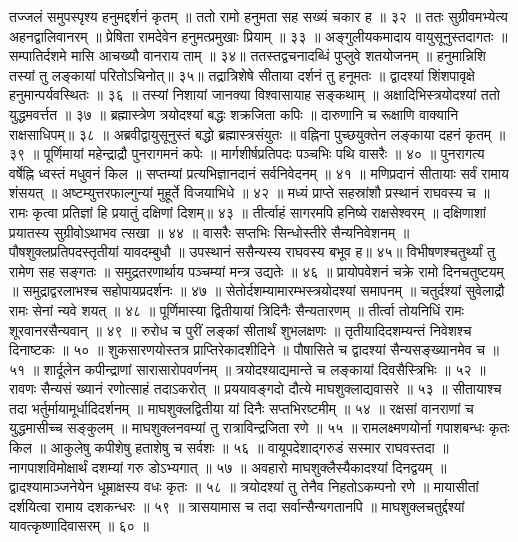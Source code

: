 तज्जलं समुपस्पृश्य हनुमद्दर्शनं कृतम् ॥
ततो रामो हनुमता सह सख्यं चकार ह ॥ ३२ ॥
ततः सुग्रीवमभ्येत्य अहनद्वालिवानरम् ॥
प्रेषिता रामदेवेन हनुमत्प्रमुखाः प्रियाम् ॥ ३३ ॥
अङ्गुलीयकमादाय वायुसूनुस्तदागतः ॥
सम्पातिर्दशमे मासि आचख्यौ वानराय ताम् ॥ ३४॥
ततस्तद्वचनादब्धिं पुप्लुवे शतयोजनम् ॥
हनुमान्निशि तस्यां तु लङ्कायां परितोऽचिनोत्॥ ३५॥
तद्रात्रिशेषे सीताया दर्शनं तु हनूमतः ॥
द्वादश्यां शिंशपावृक्षे हनुमान्पर्यवस्थितः ॥ ३६ ॥
तस्यां निशायां जानक्या विश्वासायाह सङ्कथाम् ॥
अक्षादिभिस्त्रयोदश्यां ततो युद्धमवर्त्तत ॥ ३७ ॥
ब्रह्मास्त्रेण त्रयोदश्यां बद्धः शक्रजिता कपिः ॥
दारुणानि च रूक्षाणि वाक्यानि राक्षसाधिपम्॥ ३८ ॥
अब्रवीद्वायुसूनुस्तं बद्धो ब्रह्मास्त्रसंयुतः ॥
वह्निना पुच्छयुक्तेन लङ्काया दहनं कृतम् ॥ ३९ ॥
पूर्णिमायां महेन्द्राद्रौ पुनरागमनं कपेः ॥
मार्गशीर्षप्रतिपदः पञ्चभिः पथि वासरैः ॥ ४० ॥
पुनरागत्य वर्षेह्नि ध्वस्तं मधुवनं किल ॥
सप्तम्यां प्रत्यभिज्ञानदानं सर्वनिवेदनम् ॥ ४१ ॥
मणिप्रदानं सीतायाः सर्वं रामाय शंसयत् ॥
अष्टम्युत्तरफाल्गुन्यां मुहूर्ते विजयाभिधे ॥ ४२ ॥
मध्यं प्राप्ते सहस्रांशौ प्रस्थानं राघवस्य च ॥
रामः कृत्वा प्रतिज्ञां हि प्रयातुं दक्षिणां दिशम्॥ ४३ ॥
तीर्त्वाहं सागरमपि हनिष्ये राक्षसेश्वरम् ॥
दक्षिणाशां प्रयातस्य सुग्रीवोऽथाभव त्सखा ॥ ४४ ॥
वासरैः सप्तभिः सिन्धोस्तीरे सैन्यनिवेशनम् ॥
पौषशुक्लप्रतिपदस्तृतीयां यावदम्बुधौ ॥
उपस्थानं ससैन्यस्य राघवस्य बभूव ह॥ ४५॥
विभीषणश्चतुर्थ्यां तु रामेण सह सङ्गतः ॥
समुद्रतरणार्थाय पञ्चम्यां मन्त्र उद्यतेः ॥ ४६ ॥
प्रायोपवेशनं चक्रे रामो दिनचतुष्टयम् ॥
समुद्राद्वरलाभश्च सहोपायप्रदर्शनः ॥ ४७ ॥
सेतोर्दशम्यामारम्भस्त्रयोदश्यां समापनम् ॥
चतुर्दश्यां सुवेलाद्रौ रामः सेनां न्यवे शयत् ॥ ४८ ॥
पूर्णिमास्या द्वितीयायां त्रिदिनैः सैन्यतारणम् ॥
तीर्त्वा तोयनिधिं रामः शूरवानरसैन्यवान् ॥ ४९ ॥
रुरोध च पुरीं लङ्कां सीतार्थं शुभलक्षणः ॥
तृतीयादिदशम्यन्तं निवेशश्च दिनाष्टकः ॥ ५० ॥
शुकसारणयोस्तत्र प्राप्तिरेकादशीदिने ॥
पौषासिते च द्वादश्यां सैन्यसङ्ख्यानमेव च ॥ ५१ ॥
शार्दूलेन कपीन्द्राणां सारासारोपवर्णनम् ॥
त्रयोदश्याद्यमान्ते च लङ्कायां दिवसैस्त्रिभिः ॥ ५२ ॥
रावणः सैन्यसं ख्यानं रणोत्साहं तदाऽकरोत् ॥
प्रययावङ्गदो दौत्ये माघशुक्लाद्यवासरे ॥ ५३ ॥
सीतायाश्च तदा भर्तुर्मायामूर्धादिदर्शनम् ॥
माघशुक्लद्वितीया यां दिनैः सप्तभिरष्टमीम् ॥ ५४ ॥
रक्षसां वानराणां च युद्धमासीच्च सङ्कुलम् ॥
माघशुक्लनवम्यां तु रात्राविन्द्रजिता रणे ॥ ५५ ॥
रामलक्ष्मणयोर्ना गपाशबन्धः कृतः किल ॥
आकुलेषु कपीशेषु हताशेषु च सर्वशः ॥ ५६ ॥
वायूपदेशाद्गरुडं सस्मार राघवस्तदा ॥
नागपाशविमोक्षार्थं दशम्यां गरु डोऽभ्यगात् ॥ ५७ ॥
अवहारो माघशुक्लैस्यैकादश्यां दिनद्वयम् ॥
द्वादश्यामाञ्जनेयेन धूम्राक्षस्य वधः कृतः ॥ ५८ ॥
त्रयोदश्यां तु तेनैव निहतोऽकम्पनो रणे ॥
मायासीतां दर्शयित्वा रामाय दशकन्धरः ॥ ५९ ॥
त्रासयामास च तदा सर्वान्सैन्यगतानपि ॥
माघशुक्लचतुर्द्दश्यां यावत्कृष्णादिवासरम् ॥ ६० ॥
